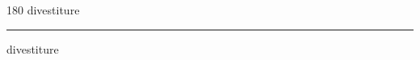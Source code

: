 
\begin{frame}
\begin{center}
\begin{turn}{180}
{\fontsize{2.5cm}{1em}\selectfont divestiture}
\end{turn}
\vspace{1em}\par  
\hrule
\vspace{1em}\par  
{\fontsize{2.5cm}{1em}\selectfont divestiture}
\end{center}
\end{frame}
